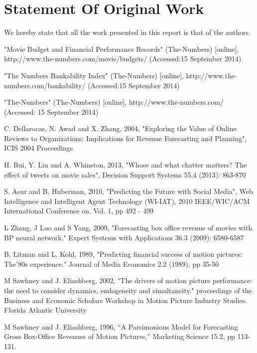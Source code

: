 \documentclass[conference]{IEEEtran}
\begin{document}
\section*{Statement Of Original Work}

We hereby state that all the work presented in this report is that of the authors.


\begin{thebibliography}{1}
"Movie Budget and Financial Performance Records" (The-Numbers)  [online], http://www.the-numbers.com/movie/budgets/ (Accessed:15 September 2014)

"The Numbers Bankability Index" (The-Numbers) [online], http://www.the-numbers.com/bankability/ (Accessed:15 September 2014)

"The-Numbers" (The-Numbers) [online], http://www.the-numbers.com/ (Accessed: 15 September 2014)

C. Dellarocas, N. Awad and X. Zhang, 2004, "Exploring the Value of Online Reviews to Organizations: Implications for Revenue Forecasting and Planning", ICIS 2004 Proceedings

H. Rui, Y. Liu and A. Whinston, 2013, "Whose and what chatter matters? The effect of tweets on movie sales", Decision Support Systems 55.4 (2013): 863-870

S. Asur and B. Huberman, 2010, "Predicting the Future with Social Media", Web Intelligence and Intelligent Agent Technology (WI-IAT), 2010 IEEE/WIC/ACM International Conference on. Vol. 1, pp 492 - 499

L Zhang, J Luo and S Yang, 2009, "Forecasting box office revenue of movies with BP neural network." Expert Systems with Applications 36.3 (2009): 6580-6587

B. Litman and L. Kohl, 1989, "Predicting financial success of motion pictures: The'80s experience." Journal of Media Economics 2.2 (1989), pp 35-50

M Sawhney and J. Eliashberg, 2002, "The drivers of motion picture performance: the need to consider dynamics, endogeneity and simultaneity." proceedings of the Business and Economic Scholars Workshop in Motion Picture Industry Studies. Florida Atlantic University

M Sawhney and J. Eliashberg, 1996, “A Parsimonious Model
for Forecasting Gross Box-Office Revenues of Motion Pictures,” Marketing Science 15.2, pp 113-131.


\end{thebibliography}
\end{document}
